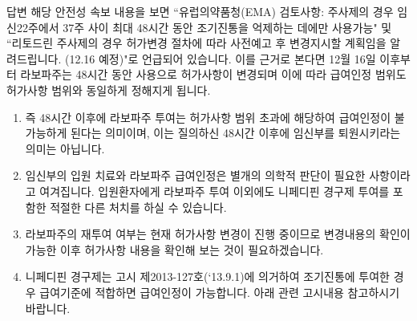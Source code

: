 \begin{commentbox}{답변}
해당 안전성 속보 내용을 보면 ``유럽의약품청(EMA) 검토사항: 주사제의 경우 임신22주에서 37주 사이 최대 48시간 동안 조기진통을 억제하는 데에만 사용가능" 및 ``리토드린 주사제의 경우 허가변경 절차에 따라 사전예고 후 변경지시할 계획임을 알려드립니다. (12.16 예정)"로 언급되어 있습니다. 이를 근거로 본다면 12월 16일 이후부터 라보파주는 48시간 동안 사용으로 허가사항이 변경되며 이에 따라 급여인정 범위도 허가사항 범위와 동일하게 정해지게 됩니다.
\begin{enumerate}\tightlist
\item 즉 48시간 이후에 라보파주 투여는 허가사항 범위 초과에 해당하여 급여인정이 불가능하게 된다는 의미이며, 이는 질의하신 48시간 이후에 임신부를 퇴원시키라는 의미는 아닙니다. 
\item 임신부의 입원 치료와 라보파주 급여인정은 별개의 의학적 판단이 필요한 사항이라고 여겨집니다. 입원환자에게 라보파주 투여 이외에도 니페디핀 경구제 투여를 포함한 적절한 다른 처치를 하실 수 있습니다.
\item 라보파주의 재투여 여부는 현재 허가사항 변경이 진행 중이므로 변경내용의 확인이 가능한 이후 허가사항 내용을 확인해 보는 것이 필요하겠습니다. 
\item 니페디핀 경구제는 고시 제2013-127호(`13.9.1)에 의거하여 조기진통에 투여한 경우 급여기준에 적합하면 급여인정이 가능합니다. 아래 관련 고시내용 참고하시기 바랍니다. 
\end{enumerate}
\end{commentbox}